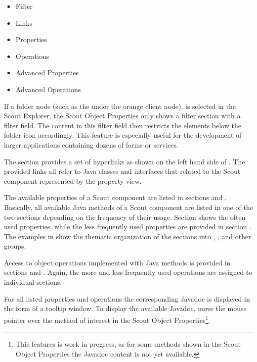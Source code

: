 \documentclass[a4paper,10pt,twoside]{book}
\begin{document}
\begin{itemize}
  \item Filter
  \item Links
  \item Properties
  \item Operations
  \item Advanced Properties
  \item Advanced Operations
\end{itemize}

If a folder node (such as the  under the orange client node), is selected in the Scout Explorer, the Scout Object Properties only shows a filter section with a filter field. 
The content in this filter field then restricts the elements below the folder icon accordingly. 
This feature is especially useful for the development of larger applications containing dozens of forms or services. 

The  section provides a set of hyperlinks as shown on the left hand side of . 
The provided links all refer to Java classes and interfaces that related to the Scout component represented by the property view. 

The available properties of a Scout component are listed in sections  and . 
Basically, all available Java  methods of a Scout component are listed in one of the two sections depending on the frequency of their usage. 
Section  shows the often used properties, while the less frequently used properties are provided in section . 
The examples in  show the thematic organization of the sections into , ,  and other groups.

Access to object operations implemented with Java  methods is provided in sections  and . 
Again, the more and less frequently used operations are assigned to individual sections. 

For all listed properties and operations the corresponding Javadoc is displayed in the form of a tooltip window. 
To display the available Javadoc, move the mouse pointer over the method of interest in the Scout Object Properties\footnote{
This features is work in progress, as for some methods shown in the Scout Object Properties the Javadoc content is not yet available. 
}. 
\end{document}
